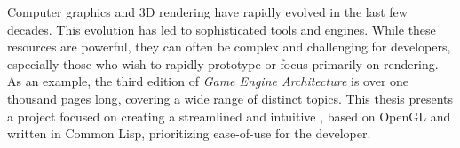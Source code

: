 Computer graphics and 3D rendering have rapidly evolved in the last few decades.
This evolution has led to sophisticated tools and engines.
While these resources are powerful,
they can often be complex and challenging for developers,
especially those who wish to rapidly prototype or focus primarily on rendering.
As an example,
the third edition of \textit{Game Engine Architecture} is over one thousand pages long\cite{gameengine_arch},
covering a wide range of distinct topics.
This thesis presents a project focused on creating a streamlined and intuitive ,
based on OpenGL and written in Common Lisp,
prioritizing ease-of-use for the developer. 
